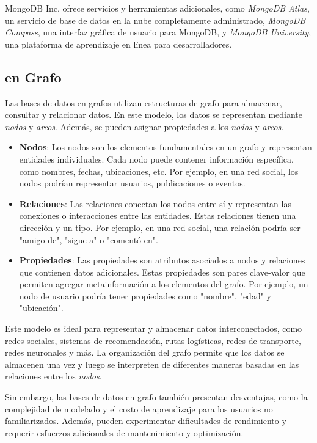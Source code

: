 \documentclass[pdflatex,sn-mathphys-num]{sn-jnl}
\theoremstyle{thmstyleone}%
\theoremstyle{thmstyletwo}%
\theoremstyle{thmstylethree}%
\begin{document}
MongoDB Inc. ofrece servicios y herramientas adicionales, como \textit{MongoDB Atlas}, un servicio de base de datos en la nube completamente administrado, \textit{MongoDB Compass}, una interfaz gráfica de usuario para MongoDB, y \textit{MongoDB University}, una plataforma de aprendizaje en línea para desarrolladores.


\subsection{en Grafo}\label{sec44}

Las bases de datos en grafos utilizan estructuras de grafo para almacenar, consultar y relacionar datos. En este modelo, los datos se representan mediante \textit{nodos} y \textit{arcos}. Además, se pueden asignar propiedades a los \textit{nodos} y \textit{arcos}.
\begin{itemize}
    \item \textbf{Nodos}: Los nodos son los elementos fundamentales en un grafo y representan entidades individuales. Cada nodo puede contener información específica, como nombres, fechas, ubicaciones, etc. Por ejemplo, en una red social, los nodos podrían representar usuarios, publicaciones o eventos.
    \item \textbf{Relaciones}: Las relaciones conectan los nodos entre sí y representan las conexiones o interacciones entre las entidades. Estas relaciones tienen una dirección y un tipo. Por ejemplo, en una red social, una relación podría ser "amigo de", "sigue a" o "comentó en".
    \item \textbf{Propiedades}: Las propiedades son atributos asociados a nodos y relaciones que contienen datos adicionales. Estas propiedades son pares clave-valor que permiten agregar metainformación a los elementos del grafo. Por ejemplo, un nodo de usuario podría tener propiedades como "nombre", "edad" y "ubicación".
\end{itemize}

Este modelo es ideal para representar y almacenar datos interconectados, como redes sociales, sistemas de recomendación, rutas logísticas, redes de transporte, redes neuronales y más. La organización del grafo permite que los datos se almacenen una vez y luego se interpreten de diferentes maneras basadas en las relaciones entre los \textit{nodos}.

Sin embargo, las bases de datos en grafo también presentan desventajas, como la complejidad de modelado y el costo de aprendizaje para los usuarios no familiarizados. Además, pueden experimentar dificultades de rendimiento y requerir esfuerzos adicionales de mantenimiento y optimización.
\end{document}
